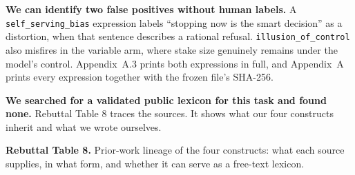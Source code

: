\textbf{We can identify two false positives without human labels.} A \texttt{self\_serving\_bias}
expression labels ``stopping now is the smart decision'' as a distortion, when that sentence
describes a rational refusal.
\texttt{illusion\_of\_control} also misfires in the variable arm, where stake size genuinely remains under the model's control.
Appendix~A.3 prints both expressions in full, and Appendix~A prints every expression together with
the frozen file's SHA-256.

\textbf{We searched for a validated public lexicon for this task and found none.} Rebuttal Table 8 traces the sources.
It shows what our four constructs inherit and what we wrote ourselves.

\vspace{0.5em}
\noindent\textbf{Rebuttal Table 8.} Prior-work lineage of the four constructs: what each source
supplies, in what form, and whether it can serve as a free-text lexicon.


